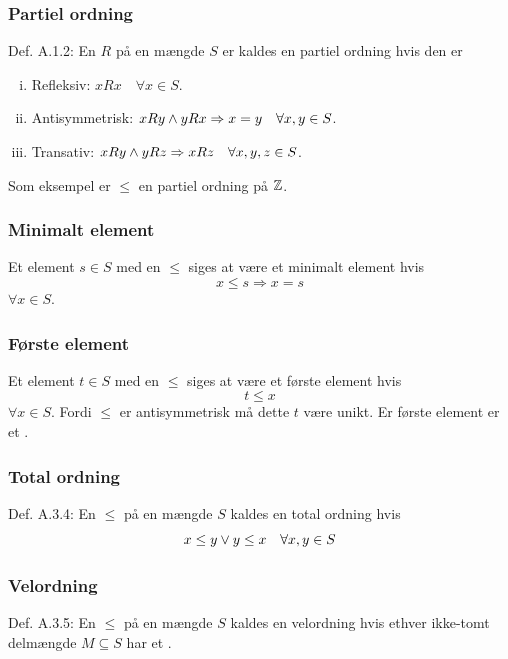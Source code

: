 \subsubsection{Partiel ordning}
\label{Partiel ordning}
Def. A.1.2: En  $R$ på en mængde $S$ er kaldes en partiel
ordning hvis den er
\begin{enumerate}[(i)]
  \item Refleksiv: $xRx \quad \forall x \in S$.
  \item Antisymmetrisk: $xRy \wedge yRx \Rightarrow x = y \quad \forall x,y
  \in S$.
  \item Transativ: $xRy \wedge yRz \Rightarrow xRz \quad \forall x,y,z \in S$.
\end{enumerate}
Som eksempel er $\leq$ en partiel ordning på $\mathbb{Z}$.

\subsubsection{Minimalt element}
\label{Minimalt element}
Et element $s \in S$ med en  $\leq$ siges at være et
minimalt element hvis
\begin{equation*}
  x \leq s \Rightarrow x = s
\end{equation*}
$\forall x \in S$.

\subsubsection{Første element}
\label{Foerste element}
Et element $t \in S$ med en  $\leq$ siges at være
et første element hvis
\begin{equation*}
  t \leq x
\end{equation*}
$\forall x \in S$. Fordi $\leq$ er antisymmetrisk må dette $t$ være unikt. Er
første element er et .

\subsubsection{Total ordning}
\label{Total ordning}
Def. A.3.4: En  $\leq$ på en mængde $S$ kaldes en total
ordning hvis
\begin{equation*}
  x \leq y \vee y \leq x \quad \forall x,y \in S
\end{equation*}

\subsubsection{Velordning}
\label{Velordning}
Def. A.3.5: En  $\leq$ på en mængde $S$ kaldes en
velordning hvis ethver ikke-tomt delmængde $M \subseteq S$ har et
.


